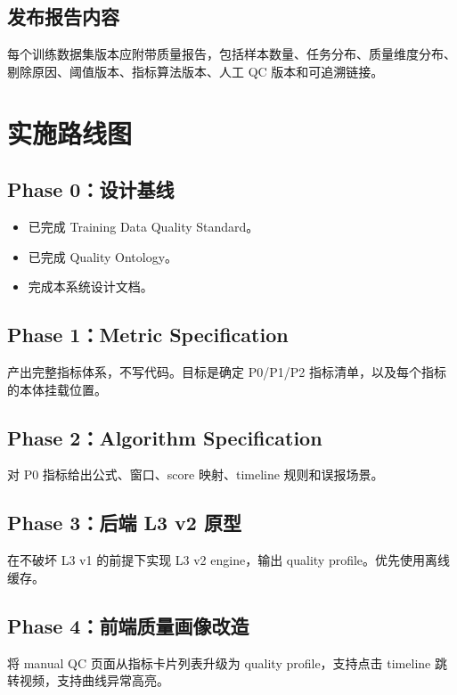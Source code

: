 \documentclass[UTF8,zihao=-4]{ctexart}
\begin{document}
\subsection{发布报告内容}

每个训练数据集版本应附带质量报告，包括样本数量、任务分布、质量维度分布、剔除原因、阈值版本、指标算法版本、人工 QC 版本和可追溯链接。

\section{实施路线图}

\subsection{Phase 0：设计基线}

\begin{itemize}
  \item 已完成 Training Data Quality Standard。
  \item 已完成 Quality Ontology。
  \item 完成本系统设计文档。
\end{itemize}

\subsection{Phase 1：Metric Specification}

产出完整指标体系，不写代码。目标是确定 P0/P1/P2 指标清单，以及每个指标的本体挂载位置。

\subsection{Phase 2：Algorithm Specification}

对 P0 指标给出公式、窗口、score 映射、timeline 规则和误报场景。

\subsection{Phase 3：后端 L3 v2 原型}

在不破坏 L3 v1 的前提下实现 L3 v2 engine，输出 quality profile。优先使用离线缓存。

\subsection{Phase 4：前端质量画像改造}

将 manual QC 页面从指标卡片列表升级为 quality profile，支持点击 timeline 跳转视频，支持曲线异常高亮。
\end{document}
